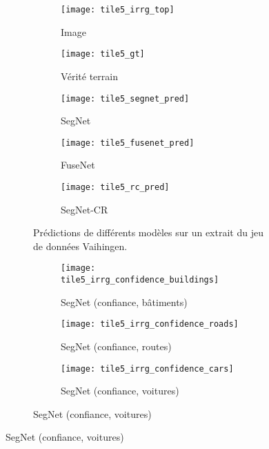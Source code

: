 \begin{figure}[hb]
	\begin{subfigure}{\textwidth}
    	\captionsetup[subfigure]{singlelinecheck=off,justification=centering}
  		\captionsetup[subfigure]{labelformat=empty}
    	\begin{subfigure}[t]{0.19\textwidth}
        	\texttt{[image: tile5\_irrg\_top]}
      		\caption*{Image }
        \end{subfigure}
        \begin{subfigure}[t]{0.19\textwidth}
        	\texttt{[image: tile5\_gt]}
        	\caption*{Vérité terrain}
        \end{subfigure}
        \begin{subfigure}[t]{0.19\textwidth}
        	\texttt{[image: tile5\_segnet\_pred]}
        	\caption*{SegNet}
        \end{subfigure}
        \begin{subfigure}[t]{0.19\textwidth}
        	\texttt{[image: tile5\_fusenet\_pred]}
        	\caption*{FuseNet}
        \end{subfigure}
        \begin{subfigure}[t]{0.19\textwidth}
        	\texttt{[image: tile5\_rc\_pred]}
        	\caption*{SegNet-CR}
        \end{subfigure}
        \caption{Prédictions de différents modèles sur un extrait du jeu de données  Vaihingen.}
        \label{fig:fusion_exemple1}
    \end{subfigure}
    	\begin{subfigure}{\textwidth}
    	\captionsetup[subfigure]{singlelinecheck=off,justification=centering}
  		\captionsetup[subfigure]{labelformat=empty}
    	\begin{subfigure}[t]{0.19\textwidth}
        	\texttt{[image: tile5\_irrg\_confidence\_buildings]}
      		\caption*{SegNet  (confiance, bâtiments)}
        \end{subfigure}
        \begin{subfigure}[t]{0.19\textwidth}
        	\texttt{[image: tile5\_irrg\_confidence\_roads]}
        	\caption*{SegNet  (confiance, routes)}
        \end{subfigure}
        \begin{subfigure}[t]{0.19\textwidth}
        	\texttt{[image: tile5\_irrg\_confidence\_cars]}
        	\caption*{SegNet  (confiance, voitures)}

\end{subfigure}
\end{subfigure}
\end{figure}

